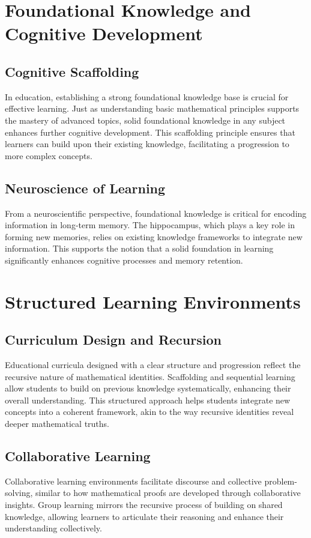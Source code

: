 \documentclass{article}
\begin{document}
\begin{enumerate}
\section{Foundational Knowledge and Cognitive Development}

\subsection{Cognitive Scaffolding}
In education, establishing a strong foundational knowledge base is crucial for effective learning. Just as understanding basic mathematical principles supports the mastery of advanced topics, solid foundational knowledge in any subject enhances further cognitive development. This scaffolding principle ensures that learners can build upon their existing knowledge, facilitating a progression to more complex concepts.

\subsection{Neuroscience of Learning}
From a neuroscientific perspective, foundational knowledge is critical for encoding information in long-term memory. The hippocampus, which plays a key role in forming new memories, relies on existing knowledge frameworks to integrate new information. This supports the notion that a solid foundation in learning significantly enhances cognitive processes and memory retention.

\section{Structured Learning Environments}

\subsection{Curriculum Design and Recursion}
Educational curricula designed with a clear structure and progression reflect the recursive nature of mathematical identities. Scaffolding and sequential learning allow students to build on previous knowledge systematically, enhancing their overall understanding. This structured approach helps students integrate new concepts into a coherent framework, akin to the way recursive identities reveal deeper mathematical truths.

\subsection{Collaborative Learning}
Collaborative learning environments facilitate discourse and collective problem-solving, similar to how mathematical proofs are developed through collaborative insights. Group learning mirrors the recursive process of building on shared knowledge, allowing learners to articulate their reasoning and enhance their understanding collectively.


\end{enumerate}
\end{document}

